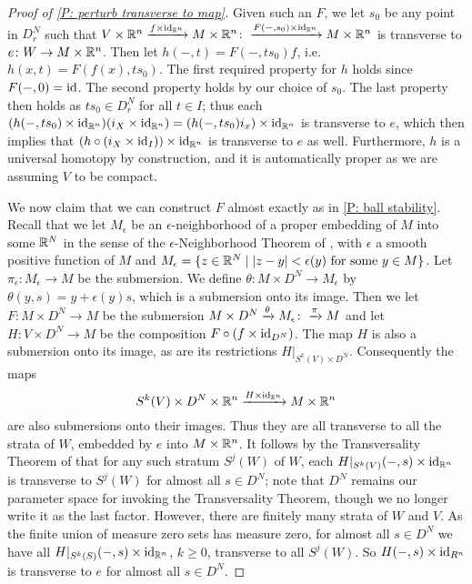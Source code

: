 \begin{proof}[Proof of \cref{P: perturb transverse to map}]
Given such an $F$, we let $s_0$ be any point in $D_r^N$ such that $V \times \mathbb{R}^n \xrightarrow{f \times \mathrm{id}_{\mathbb{R}^n}} M \times \mathbb{R}^n\colon\xrightarrow{F(-,s_0) \times \mathrm{id}_{\mathbb{R}^n}}M \times \mathbb{R}^n$ is transverse to $e \colon W \to M \times \mathbb{R}^n$. Then let $h(-,t) = F(-,ts_0)f$, i.e.\ $h(x,t) = F(f(x),ts_0)$. The first required property for $h$ holds since $F(-,0) = \mathrm{id}$. The second property holds by our choice of $s_0$. The last property then holds as $ts_0 \in D_r^N$ for all $t \in I$; thus each $(h(-,ts_0) \times \mathrm{id}_{\mathbb{R}^n})(i_X \times \mathrm{id}_{\mathbb{R}^n}) = (h(-,ts_0)i_x) \times \mathrm{id}_{\mathbb{R}^n}$ is transverse to $e$, which then implies that $(h\circ(i_{X} \times \mathrm{id}_I)) \times \mathrm{id}_{\mathbb{R}^n}$ is transverse to $e$ as well. Furthermore, $h$ is a universal homotopy by construction, and it is automatically proper as we are assuming $V$ to be compact.

We now claim that we can construct $F$ almost exactly as in \cref{P: ball stability}. Recall that we let $M_\epsilon$ be an $\epsilon$-neighborhood of a proper embedding of $M$ into some $\mathbb{R}^N$ in the sense of the $\epsilon$-Neighborhood Theorem of \cite[Section 2.3]{GuPo74}, with $\epsilon$ a smooth positive function of $M$ and $M_\epsilon = \{z \in \mathbb{R}^N \mid |z-y|<\epsilon(y) \text{ for some }y \in M\}$.
Let $\pi_\epsilon: M_\epsilon \to M$ be the submersion.
We define $\theta: M \times D^N \to M_\epsilon$ by $\theta(y, s) = y + \epsilon(y) s$, which is a submersion onto its image.
Then we let $F \colon M \times D^N \to M$ be the submersion $M \times D^N \xrightarrow{\theta}M_\epsilon\colon\xrightarrow{\pi}M$ and let $H \colon V \times D^N \to M$ be the composition $F \circ (f \times \mathrm{id}_{D^N})$. The map $H$ is also a submersion onto its image, as are its restrictions $H|_{S^k(V) \times D^N}$.
Consequently the maps
$$S^k(V) \times D^N \times \mathbb{R}^n \xrightarrow{H \times \mathrm{id}_{\mathbb{R}^n}} M \times \mathbb{R}^n$$
are also submersions onto their images. Thus they are all transverse to all the strata of $W$, embedded by $e$ into $M \times \mathbb{R}^n$.
It follows by the Transversality Theorem of \cite[Section 2.3]{GuPo74} that for any such stratum $S^j(W)$ of $W$, each $H|_{S^k(V)}(-,s) \times \mathrm{id}_{\mathbb{R}^n}$ is transverse to $S^j(W)$ for almost all $s \in D^N$; note that $D^N$ remains our parameter space for invoking the Transversality Theorem, though we no longer write it as the last factor. However, there are finitely many strata of $W$ and $V$. As the finite union of measure zero sets has measure zero, for almost all $s \in D^N$ we have all $H|_{S^k(S)}(-,s) \times \mathrm{id}_{\mathbb{R}^n}$, $k\geq 0$, transverse to all $S^j(W)$. So $H(-,s) \times \mathrm{id}_{R^n}$ is transverse to $e$ for almost all $s \in D^N$.


\end{proof}
